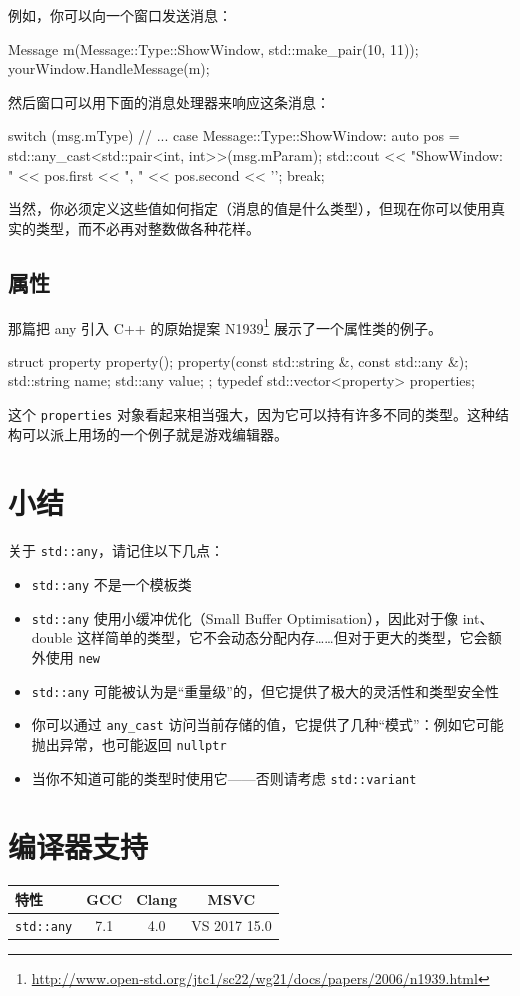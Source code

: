 例如，你可以向一个窗口发送消息：

\begin{codebox}[cpp]
Message m(Message::Type::ShowWindow, std::make_pair(10, 11));
yourWindow.HandleMessage(m);
\end{codebox}

然后窗口可以用下面的消息处理器来响应这条消息：

\begin{codebox}[cpp]
switch (msg.mType) {
// ...
case Message::Type::ShowWindow:
{
auto pos = std::any_cast<std::pair<int, int>>(msg.mParam);
std::cout << "ShowWindow: "
<< pos.first << ", "
<< pos.second << '\n';
break;
}
}
\end{codebox}

当然，你必须定义这些值如何指定（消息的值是什么类型），但现在你可以使用真实的类型，而不必再对整数做各种花样。


\subsection{属性}

那篇把 any 引入 C++ 的原始提案 N1939\footnote{\url{http://www.open-std.org/jtc1/sc22/wg21/docs/papers/2006/n1939.html}} 展示了一个属性类的例子。

\begin{codebox}[cpp]
struct property
{
property();
property(const std::string &, const std::any &);
std::string name;
std::any value;
};
typedef std::vector<property> properties;
\end{codebox}

这个 \texttt{properties} 对象看起来相当强大，因为它可以持有许多不同的类型。这种结构可以派上用场的一个例子就是游戏编辑器。


\section{小结}

关于 \texttt{std::any}，请记住以下几点：
\begin{itemize}
\item \texttt{std::any} 不是一个模板类
\item \texttt{std::any} 使用小缓冲优化（Small Buffer Optimisation），因此对于像 int、double 这样简单的类型，它不会动态分配内存……但对于更大的类型，它会额外使用 \texttt{new}
\item \texttt{std::any} 可能被认为是“重量级”的，但它提供了极大的灵活性和类型安全性
\item 你可以通过 \texttt{any\_cast} 访问当前存储的值，它提供了几种“模式”：例如它可能抛出异常，也可能返回 \texttt{nullptr}
\item 当你不知道可能的类型时使用它——否则请考虑 \texttt{std::variant}
\end{itemize}


\section{编译器支持}

\begin{table}[H]
\centering
\begin{tabularx}{\textwidth}{X c c c}
\toprule
特性 & GCC & Clang & MSVC \\
\midrule
\texttt{std::any} & 7.1 & 4.0 & VS 2017 15.0 \\
\bottomrule
\end{tabularx}
\end{table}
